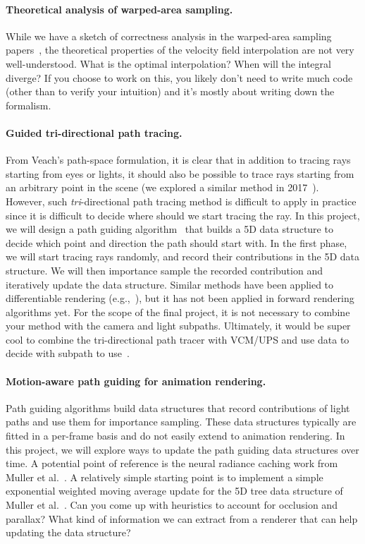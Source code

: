 \paragraph{Theoretical analysis of warped-area sampling.}
While we have a sketch of correctness analysis in the warped-area sampling papers~\cite{Bangaru:2020:UWS,Bangaru:2022:DRN,Xu:2023:PSDR-WAS}, the theoretical properties of the velocity field interpolation are not very well-understood. What is the optimal interpolation? When will the integral diverge? If you choose to work on this, you likely don't need to write much code (other than to verify your intuition) and it's mostly about writing down the formalism.

\paragraph{Guided tri-directional path tracing.}
From Veach's path-space formulation, it is clear that in addition to tracing rays starting from eyes or lights, it should also be possible to trace rays starting from an arbitrary point in the scene (we explored a similar method in 2017~\cite{Anderson:2017:AED}). 
However, such \emph{tri}-directional path tracing method is difficult to apply in practice since it is difficult to decide where should we start tracing the ray. 
In this project, we will design a path guiding algorithm~\cite{Lafortune:1995:5RV,Muller:2017:PPG} that builds a 5D data structure to decide which point and direction the path should start with.
In the first phase, we will start tracing rays randomly, and record their contributions in the 5D data structure.
We will then importance sample the recorded contribution and iteratively update the data structure.
Similar methods have been applied to differentiable rendering (e.g.,~\cite{Yan:2022:EEB}), but it has not been applied in forward rendering algorithms yet.
For the scope of the final project, it is not necessary to combine your method with the camera and light subpaths.
Ultimately, it would be super cool to combine the tri-directional path tracer with VCM/UPS and use data to decide with subpath to use~\cite{Grittmann:2022:EMI}.

\paragraph{Motion-aware path guiding for animation rendering.}
Path guiding algorithms build data structures that record contributions of light paths and use them for importance sampling.
These data structures typically are fitted in a per-frame basis and do not easily extend to animation rendering. 
In this project, we will explore ways to update the path guiding data structures over time.
A potential point of reference is the neural radiance caching work from Muller et al.~\cite{Muller:2021:RNR}.
A relatively simple starting point is to implement a simple exponential weighted moving average update for the 5D tree data structure of Muller et al.~\cite{Muller:2017:PPG}.
Can you come up with heuristics to account for occlusion and parallax? What kind of information we can extract from a renderer that can help updating the data structure?

